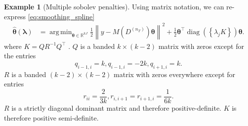 \documentclass[12pt]{article} %
\theoremstyle{definition}
\newtheorem{example}{Example}
\DeclareMathOperator{\diag}{diag}
\DeclareMathOperator*{\argmin}{arg\,min}
\begin{document}
\begin{example}[Multiple sobolev penalties]
	Using matrix notation, we can re-express \eqref{eq:smoothing_spline}
	\begin{align}
	\hat{\boldsymbol{\theta}}(\boldsymbol{\lambda})
	& = \argmin_{\boldsymbol{\theta} \in \mathbb{R}^{kJ}}
	\frac{1}{2}
	\left \|
	y - M(D^{(n_T)}) \boldsymbol{\theta}
	\right \|^2
	+
	\frac{1}{2}
	\boldsymbol{\theta}^\top
	\diag \left (
	\left \{
	\lambda_j K
	\right \} \right ) \boldsymbol{\theta}.
	\label{eq:matrix_sobolev}
	\end{align}
	where $K = QR^{-1}Q^\top$ \citep{green1993nonparametric}.
	$Q$ is a banded $k \times (k-2)$ matrix with zeros except for the entries
	$$
	q_{i-1,i} = k, q_{i-1,i} = -2k, q_{i + 1,i} = k.
	$$
	$R$ is a banded $(k-2) \times (k-2)$ matrix with zeros everywhere except for entries
	$$
	r_{ii} = \frac{2}{3k}, r_{i, i+ 1} = r_{i+ 1, i} = \frac{1}{6k}.
	$$
	$R$ is a strictly diagonal dominant matrix and therefore positive-definite.
	$K$ is therefore positive semi-definite.


\end{example}
\end{document}
